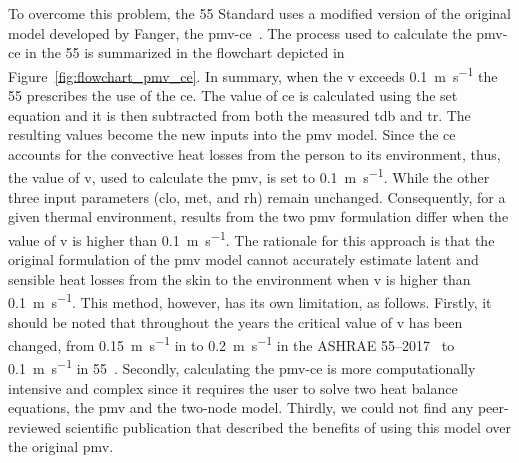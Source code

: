 To overcome this problem, the \gls{55} Standard uses a modified version of the original model developed by Fanger, the \gls{pmv-ce}~\cite{ashrae552020}.
The process used to calculate the \gls{pmv-ce} in the \gls{55} is summarized in the flowchart depicted in Figure~\ref{fig:flowchart_pmv_ce}.
In summary, when the \ac{v} exceeds \qty{0.1}{\m\per\s} the \gls{55} prescribes the use of the \ac{ce}.
The value of \ac{ce} is calculated using the \ac{set} equation and it is then subtracted from both the measured \ac{tdb} and \ac{tr}.
The resulting values become the new inputs into the \ac{pmv} model.
Since the \ac{ce} accounts for the convective heat losses from the person to its environment, thus, the value of \ac{v}, used to calculate the \ac{pmv}, is set to \qty{0.1}{\m\per\s}.
While the other three input parameters (\ac{clo}, \ac{met}, and \ac{rh}) remain unchanged.
Consequently, for a given thermal environment, results from the two \ac{pmv} formulation differ when the value of \ac{v} is higher than \qty{0.1}{\m\per\s}.
The rationale for this approach is that the original formulation of the \ac{pmv} model cannot accurately estimate latent and sensible heat losses from the skin to the environment when \ac{v} is higher than \qty{0.1}{\m\per\s}.
This method, however, has its own limitation, as follows.
Firstly, it should be noted that throughout the years the critical value of \ac{v} has been changed, from \qty{0.15}{\m\per\s} in  to \qty{0.2}{\m\per\s} in the ASHRAE 55--2017~\cite{ASHRAE552017} to \qty{0.1}{\m\per\s} in \gls{55}~\cite{ashrae552020}.
Secondly, calculating the \gls{pmv-ce} is more computationally intensive and complex since it requires the user to solve two heat balance equations, the \ac{pmv} and the two-node model.
Thirdly, we could not find any peer-reviewed scientific publication that described the benefits of using this model over the original \ac{pmv}.

